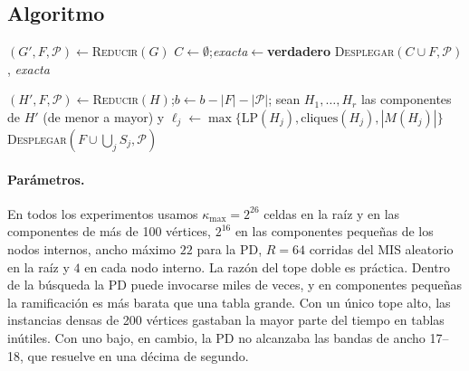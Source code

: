 \subsection{Algoritmo}
\begin{algorithm}[!htbp]
\caption{\hyvc$(G;\ \kappa_{\max},R,T)$}\label{alg:hyvc}
$(G',F,\mathcal P)\gets$\textsc{Reducir}$(G)$
$C\gets\emptyset$;\quad \textit{exacta}$\gets$\textbf{verdadero}\;
\Return \textsc{Desplegar}$(C\cup F,\mathcal P)$, \textit{exacta}\;
\end{algorithm}

\begin{algorithm}[!htbp]
\caption{\textsc{Resolver}$(H,b)$: cubierta mínima de $H$ si $\tau(H)<b$; si no, $\bot$}\label{alg:resolver}
$(H',F,\mathcal P)\gets$\textsc{Reducir}$(H)$;\quad $b\gets b-|F|-|\mathcal P|$;\quad {}
sean $H_1,\dots,H_r$ las componentes de $H'$ (de menor a mayor) y $\ell_j\gets\max\{\mathrm{LP}(H_j),\mathrm{cliques}(H_j),|M(H_j)|\}$\;
\Return \textsc{Desplegar}$(F\cup\bigcup_jS_j,\mathcal P)$\;
\end{algorithm}

\paragraph{Parámetros.} En todos los experimentos usamos $\kappa_{\max}=2^{26}$ celdas en la raíz y en las componentes de más de 100 vértices, $2^{16}$ en las componentes pequeñas de los nodos internos, ancho máximo $22$ para la PD, $R=64$ corridas del MIS aleatorio en la raíz y $4$ en cada nodo interno. La razón del tope doble es práctica. Dentro de la búsqueda la PD puede invocarse miles de veces, y en componentes pequeñas la ramificación es más barata que una tabla grande. Con un único tope alto, las instancias densas de 200 vértices gastaban la mayor parte del tiempo en tablas inútiles. Con uno bajo, en cambio, la PD no alcanzaba las bandas de ancho 17--18, que resuelve en una décima de segundo.

